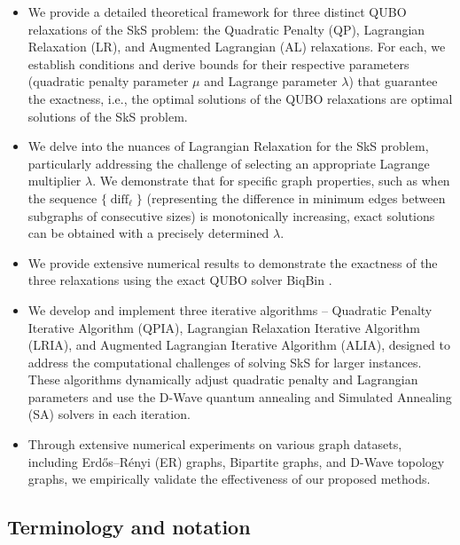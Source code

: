 \documentclass{article}
\DeclareMathOperator{\diff}{diff}
\begin{document}
\begin{itemize}
   \item We provide a detailed theoretical framework for three distinct QUBO relaxations of the SkS problem: the  Quadratic Penalty (QP), Lagrangian Relaxation (LR), and Augmented Lagrangian (AL) relaxations. For each, we establish conditions and derive bounds for their respective parameters (quadratic penalty parameter $\mu$ and Lagrange parameter $\lambda$) that guarantee the exactness, i.e., the optimal solutions of the QUBO relaxations are optimal solutions of the SkS problem. 

    \item We delve into the nuances of Lagrangian Relaxation for the SkS problem, particularly addressing the challenge of selecting an appropriate Lagrange multiplier $\lambda$.
 We demonstrate that for specific graph properties, such as when the sequence $\{\diff_{\ell}\}$
     (representing the difference in minimum edges between subgraphs of consecutive sizes) is monotonically increasing, exact solutions can be obtained with a precisely determined $\lambda$.
     \item We provide extensive numerical results to demonstrate the exactness of the three relaxations using the exact QUBO solver BiqBin \cite{gusmeroli2022biqbin}.  
     
     \item We develop and implement three iterative algorithms -- Quadratic Penalty Iterative Algorithm (QPIA), Lagrangian Relaxation Iterative Algorithm (LRIA), and Augmented Lagrangian Iterative Algorithm (ALIA), designed to address the computational challenges of solving SkS for larger instances. These algorithms dynamically adjust quadratic penalty and Lagrangian parameters and use the D-Wave quantum annealing and  Simulated Annealing (SA) solvers in each iteration.

     \item Through extensive numerical experiments on various graph datasets, including Erd\H{o}s--R\'enyi (ER) graphs, Bipartite graphs, and D-Wave topology graphs, we empirically validate the effectiveness of our proposed methods.
     
     \end{itemize}

 \subsection{Terminology and notation}
\end{document}
